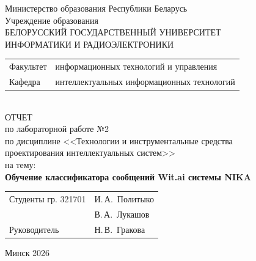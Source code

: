 \begin{titlepage}
	\begin{center}
		Министерство образования Республики Беларусь\\[1em]
		Учреждение образования\\
		БЕЛОРУССКИЙ ГОСУДАРСТВЕННЫЙ УНИВЕРСИТЕТ \\
		ИНФОРМАТИКИ И РАДИОЭЛЕКТРОНИКИ\\[1em]
		
		\begin{minipage}{\textwidth}
			\begin{flushleft}
				\begin{tabular}{ l l }
					Факультет & информационных технологий и управления\\
					Кафедра   & интеллектуальных информационных технологий
				\end{tabular}
			\end{flushleft}
		\end{minipage}\\[1em]
		
		{ОТЧЕТ}\\
		{по лабораторной работе №2}\\
		{по дисциплине <<Технологии и инструментальные средства}\\
		{проектирования интеллектуальных систем>>}\\
		{на тему:}\\[1em]
		\textbf{Обучение классификатора сообщений Wit.ai системы NIKA}\\[1em]
		
		\vspace{2em}
		\begin{tabular}{ p{}p{} }
			Студенты гр. 321701 & И.\,А.~Политыко \\
			& В.\,А.~Лукашов \\
			Руководитель & Н.\,В.~Гракова \\
		\end{tabular}
		
		\vfill
		{\normalsize Минск 2026}
	\end{center}
\end{titlepage}

